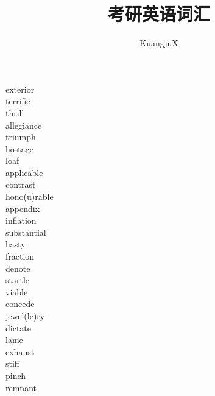 \documentclass[a4paper, 10pt]{ctexart}
\title{考研英语词汇}
\author{KuangjuX}
\begin{document}
\begin{multicols*}{2}
    \begin{description}

\item[exterior]

\item[terrific]

\item[thrill]

\item[allegiance]

\item[triumph]

\item[hostage ]

\item[loaf]

\item[applicable]

\item[contrast]

\item[hono(u)rable]

\item[appendix]

\item[inflation]

\item[substantial]

\item[hasty]

\item[fraction]

\item[denote]

\item[startle]

\item[viable]

\item[concede]

\item[jewel(le)ry]

\item[dictate]

\item[lame]

\item[exhaust]

\item[stiff]

\item[pinch]

\item[remnant]


\end{description}
\end{multicols*}
\end{document}
